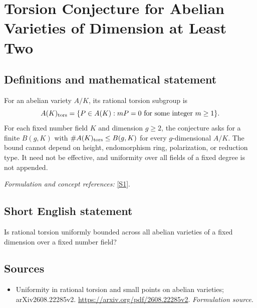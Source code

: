\documentclass[11pt]{article}
\begin{document}
\section*{\texorpdfstring{Torsion Conjecture for Abelian Varieties of Dimension at Least Two}{Torsion Conjecture for Abelian Varieties of Dimension at Least Two}}\label{141}
\subsection{Definitions and mathematical statement}
For an abelian variety $A/K$, its rational torsion subgroup is
\[
 A(K)_{\rm tors}=\{P\in A(K):mP=0\text{ for some integer }m\ge1\}.
\]
For each fixed number field $K$ and dimension $g\ge2$, the conjecture asks for a finite $B(g,K)$ with $\#A(K)_{\rm tors}\le B(g,K)$ for every $g$-dimensional $A/K$. The bound cannot depend on height, endomorphism ring, polarization, or reduction type. It need not be effective, and uniformity over all fields of a fixed degree is not appended.
\par\smallskip\textit{Formulation and concept references:} \href{https://arxiv.org/pdf/2608.22285v2}{[S1]}.

\subsection{Short English statement}
Is rational torsion uniformly bounded across all abelian varieties of a fixed dimension over a fixed number field?
\subsection{Sources}
\begin{itemize}
\item[S1]Uniformity in rational torsion and small points on abelian varieties; arXiv2608.22285v2.
\url{https://arxiv.org/pdf/2608.22285v2}.
\textit{Formulation source.}
\end{itemize}
\end{document}
